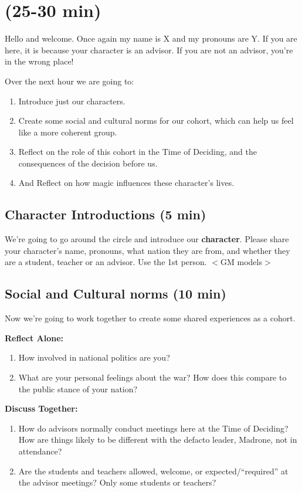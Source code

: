 \documentclass[green]{GL2020}
\begin{document}
\name{\gPreGameAdvisor{}}

\section*{(25-30 min)}

Hello and welcome. Once again my name is X and my pronouns are Y. If you are here, it is because your character is an advisor. If you are not an advisor, you're in the wrong place!

Over the next hour we are going to:
\begin{enumerate}
	\item Introduce just our characters.
	\item Create some social and cultural norms for our cohort, which can help us feel like a more coherent group.
	\item Reflect on the role of this cohort in the Time of Deciding, and the consequences of the decision before us.
	\item And Reflect on how magic influences these character’s lives.
\end{enumerate}

\subsection*{Character Introductions (5 min)}
We’re going to go around the circle and introduce our \textbf{character}. Please share your character’s name, pronouns, what nation they are from, and whether they are a student, teacher or an advisor. Use the 1st person. $<$GM models$>$

\subsection*{Social and Cultural norms (10 min)}
Now we’re going to work together to create some shared experiences as a cohort.

\textbf{Reflect Alone:} 
\begin{enumerate}
	\item How involved in national politics are you?
	\item What are your personal feelings about the war? How does this compare to the public stance of your nation?
\end{enumerate}

\textbf{Discuss Together:}
\begin{enumerate}
	\item How do advisors normally conduct meetings here at the Time of Deciding? How are things likely to be different with the defacto leader, Madrone, not in attendance?
	\item Are the students and teachers allowed, welcome, or expected/``required'' at the advisor meetings? Only some students or teachers?
\end{enumerate}
\end{document}
